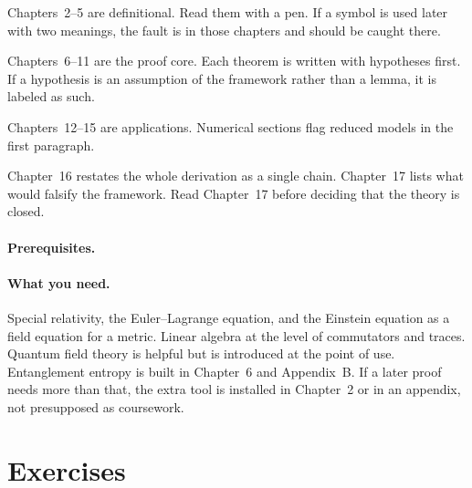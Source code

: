 Chapters~2--5 are definitional. Read them with a pen. If a symbol is
used later with two meanings, the fault is in those chapters and should
be caught there.

Chapters~6--11 are the proof core. Each theorem is written with
hypotheses first. If a hypothesis is an assumption of the framework
rather than a lemma, it is labeled as such.

Chapters~12--15 are applications. Numerical sections flag reduced
models in the first paragraph.

Chapter~16 restates the whole derivation as a single chain. Chapter~17
lists what would falsify the framework. Read Chapter~17 before deciding
that the theory is closed.

\paragraph{Prerequisites.}
\paragraph{What you need.}
Special relativity, the Euler--Lagrange equation, and the Einstein
equation as a field equation for a metric. Linear algebra at the
level of commutators and traces. Quantum field theory is helpful
but is introduced at the point of use. Entanglement entropy is
built in Chapter~6 and Appendix~B. If a later proof needs more
than that, the extra tool is installed in Chapter~2 or in an
appendix, not presupposed as coursework.

\section{Exercises}
\label{sec:ch1-exercises}

